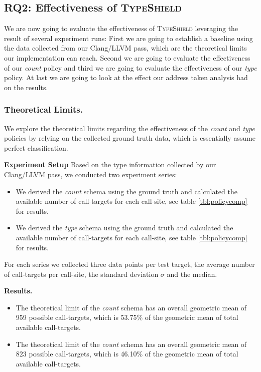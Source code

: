 %
%
%
%
\subsection{RQ2: Effectiveness of \textsc{TypeShield}}
\label{section:typeshieldeffectiveness}

We are now going to evaluate the effectiveness of \textsc{TypeShield} leveraging the result of several experiment runs: First we are going to establish a baseline using the data 
collected from our Clang/LLVM pass, which are the theoretical limits our implementation can reach. Second we are going to evaluate the effectiveness of our \textit{count} 
policy and third we are going to evaluate the effectiveness of our \textit{type} policy. At last we are going to look at the effect our address taken analysis had on the results.

\subsubsection{Theoretical Limits.}
\label{subsection:theoreticallimit}
We explore the theoretical limits regarding the effectiveness of the \textit{count} and \textit{type} policies by relying on the collected ground truth data, which is essentially assume perfect classification.

\textbf{Experiment Setup} Based on the type information collected by our Clang/LLVM pass, we conducted two experiment series:
\begin{itemize}
\item We derived the \textit{count} schema using the ground truth and calculated the available number of call-targets for each call-site, see table \ref{tbl:policycomp} for results.
\item We derived the \textit{type} schema using the ground truth and calculated the available number of call-targets for each call-site, see table \ref{tbl:policycomp} for results.
\end{itemize}
For each series we collected three data points per test target, the average number of call-targets per call-site, the standard deviation $\sigma$ and the median.

\textbf{Results.}
\begin{itemize}
\item The theoretical limit of the \textit{count} schema has an overall geometric mean of 959 possible call-targets, which is 53.75\% of the geometric mean of total available 
call-targets.
\item The theoretical limit of the \textit{count} schema has an overall geometric mean of 823 possible call-targets, which is 46.10\% of the geometric mean of total available
call-targets.
\end{itemize}

